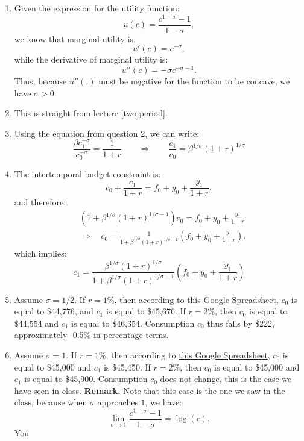 \documentclass[]{book}
\begin{document}
\begin{enumerate}
\def\labelenumi{\arabic{enumi}.}
\item
  Given the expression for the utility function:
  \[u(c) = \frac{c^{1-\sigma}-1}{1-\sigma},\] we know that marginal
  utility is: \[u'(c)=c^{-\sigma},\] while the derivative of marginal
  utility is: \[u''(c)=-\sigma c^{-\sigma-1}.\] Thus, because \(u''(.)\)
  must be negative for the function to be concave, we have \(\sigma>0\).
\item
  This is straight from lecture \ref{two-period}.
\item
  Using the equation from question 2, we can write:
  \[\frac{\beta c_1^{-\sigma}}{c_0^{-\sigma}}=\frac{1}{1+r} \qquad \Rightarrow \qquad \frac{c_1}{c_0}=\beta^{1/\sigma} (1+r)^{1/\sigma}\]
\item
  The intertemporal budget constraint is:
  \[c_0 + \frac{c_1}{1+r} = f_0 + y_0 + \frac{y_1}{1+r},\] and
  therefore: \[\begin{aligned}
  & \left(1 + \beta^{1/\sigma}(1+r)^{1/\sigma-1} \right)c_0 = f_0 + y_0 + \frac{y_1}{1+r} \\
  & \Rightarrow \quad c_0 = \frac{1}{1 + \beta^{1/\sigma}(1+r)^{1/\sigma-1}} \left( f_0 + y_0 + \frac{y_1}{1+r}\right).
  \end{aligned}\] which implies:
  \[c_1 = \frac{\beta^{1/\sigma}(1+r)^{1/\sigma}}{1 + \beta^{1/\sigma}(1+r)^{1/\sigma-1}} \left( f_0 + y_0 + \frac{y_1}{1+r}\right)\]
\item
  Assume \(\sigma = 1/2\). If \(r = 1\%\), then according to
  \href{https://docs.google.com/spreadsheets/d/1dDFa5YZE5170Tv36klHQ19ykK2bP9wjeR0Y1_h-kacg/edit?usp=sharing}{this
  Google Spreadsheet}, \(c_0\) is equal to \$44,776, and \(c_1\) is
  equal to \$45,676. If \(r = 2\%\), then \(c_0\) is equal to \$44,554
  and \(c_1\) is equal to \$46,354. Consumption \(c_0\) thus falls by
  \$222, approximately -0.5\% in percentage terms.
\item
  Assume \(\sigma = 1\). If \(r = 1\%\), then according to
  \href{https://docs.google.com/spreadsheets/d/1dDFa5YZE5170Tv36klHQ19ykK2bP9wjeR0Y1_h-kacg/edit?usp=sharing}{this
  Google Spreadsheet}, \(c_0\) is equal to \$45,000 and \(c_1\) is
  \$45,450. If \(r = 2\%\), then \(c_0\) is equal to \$45,000 and
  \(c_1\) is equal to \$45,900. Consumption \(c_0\) does not change,
  this is the case we have seen in class. \textbf{Remark.} Note that
  this case is the one we saw in the class, because when \(\sigma\)
  approaches \(1\), we have:
  \[\lim_{\sigma \to 1} \frac{c^{1-\sigma}-1}{1-\sigma}=\log(c).\] You

\end{enumerate}
\end{document}
